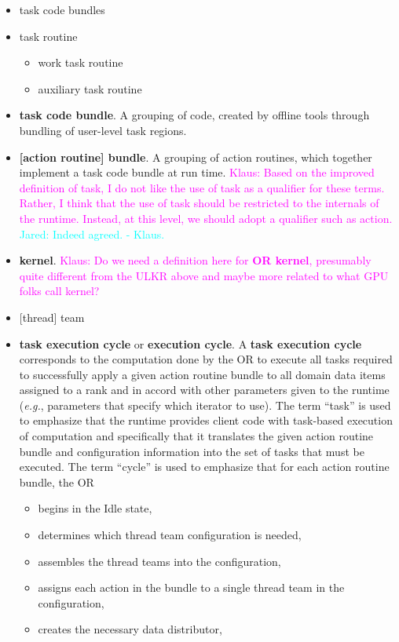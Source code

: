 \documentclass{article}
\newcommand{\eg}{\textit{e.g.}}   %
\newcommand{\JaredRfromKW}[1]   {\textcolor{cyan}{Jared: #1 - Klaus.}}
\newcommand{\Klaus}[1]          {\textcolor{magenta}{Klaus: #1}}
\newcommand{\shortULKR}  {ULKR\xspace}
\newcommand{\shortOR}   {OR\xspace}
\newcommand{\ULKR}   {\shortULKR}
\newcommand{\OR}        {\shortOR}
\newcommand{\taskcodebundle}     {task code bundle\xspace}
\newcommand{\taskcodebundles}    {task code bundles\xspace}
\newcommand{\taskroutine}        {task routine\xspace}
\newcommand{\actionroutine}        {action routine\xspace}       %
\newcommand{\actionroutines}       {action routines\xspace}
\newcommand{\ULtaskregs}            {user-level task regions\xspace} %
\begin{document}
\begin{itemize}
\item \taskcodebundles
\item \taskroutine
  \begin{itemize}
    \item work \taskroutine
    \item auxiliary \taskroutine
  \end{itemize}
\item \textbf{\taskcodebundle}. A grouping of code, created by offline tools through bundling of \ULtaskregs.
\item \textbf{[\actionroutine] bundle}. A grouping of \actionroutines, which together implement a \taskcodebundle
at run time.  \Klaus{Based on the improved definition of task, I do not like the
use of task as a qualifier for these terms.  Rather, I think that the use of task should be
restricted to the internals of the runtime.  Instead, at this level, we
should adopt a qualifier such as action.}
\JaredRfromKW{Indeed agreed.}
\item \textbf{kernel}. \Klaus{Do we need a definition here for \textbf{OR kernel}, presumably
quite different from the \ULKR above and maybe more related to what GPU folks call kernel?}
\item {[}thread{]} team
\item \textbf{task execution cycle} or \textbf{execution cycle}.  A \textbf{task
execution cycle} corresponds to the computation done by
the \OR to execute all tasks required to successfully apply a given action
routine bundle to all domain data items assigned to a rank and in accord with
other parameters given to the runtime (\eg, parameters that specify which iterator
to use).  The term ``task'' is used to emphasize that the runtime provides
client code with task-based execution of computation and specifically that it
translates the given action routine bundle and configuration information into
the set of tasks that must be executed.  The term ``cycle'' is used to emphasize
that for each action routine bundle, the \OR
\begin{itemize}
\item{begins in the Idle state,}
\item{determines which thread team configuration is needed,}
\item{assembles the thread teams into the configuration,}
\item{assigns each action in the bundle to a single thread team in the
configuration,}
\item{creates the necessary data distributor,}

\end{itemize}
\end{itemize}
\end{document}
